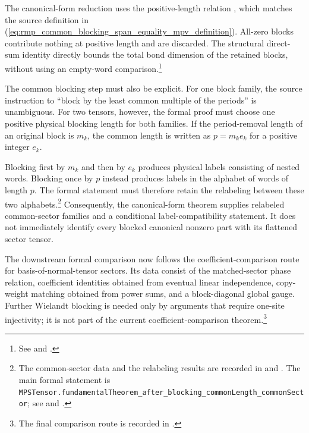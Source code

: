 \documentclass{article}
\begin{document}
The canonical-form reduction uses the positive-length relation
, which matches the source definition in
(\ref{eq:rmp_common_blocking_span_equality_mpv_definition}). All-zero blocks
contribute nothing at positive length and are discarded. The structural
direct-sum identity directly bounds the total bond dimension of the retained
blocks, without using an empty-word comparison.\footnote{See
 and
.}

The common blocking step must also be explicit. For one block family, the source
instruction to ``block by the least common multiple of the periods'' is
unambiguous. For two tensors, however, the formal proof must choose one positive
physical blocking length for both families. If the period-removal length of an
original block is $m_k$, the common length is written as $p=m_ke_k$ for a
positive integer $e_k$.

Blocking first by $m_k$ and then by $e_k$ produces physical labels consisting
of nested words. Blocking once by $p$ instead produces labels in the alphabet
of words of length $p$. The formal statement must therefore retain the
relabeling between these two alphabets.\footnote{The common-sector data and the
relabeling results are recorded in
 and
. The main formal
statement is
\texttt{MPSTensor.fundamentalTheorem\_after\_blocking\_commonLength\_commonSector};
see
 and
.}
Consequently, the canonical-form theorem supplies relabeled common-sector
families and a conditional label-compatibility statement. It does not
immediately identify every blocked canonical nonzero part with its flattened
sector tensor.

The downstream formal comparison now follows the coefficient-comparison route
for basis-of-normal-tensor sectors. Its data consist of the matched-sector phase
relation, coefficient identities obtained from eventual linear independence,
copy-weight matching obtained from power sums, and a block-diagonal global
gauge. Further Wielandt blocking is needed only by arguments that require
one-site injectivity; it is not part of the current coefficient-comparison
theorem.\footnote{The final comparison route is recorded in
.}
\end{document}
